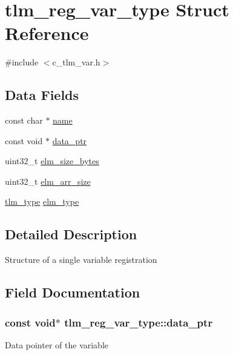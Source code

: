 \hypertarget{structtlm__reg__var__type}{}\section{tlm\+\_\+reg\+\_\+var\+\_\+type Struct Reference}
\label{structtlm__reg__var__type}


{\ttfamily \#include $<$c\+\_\+tlm\+\_\+var.\+h$>$}

\subsection*{Data Fields}
\begin{DoxyCompactItemize}
\item 
const char $\ast$ \hyperlink{structtlm__reg__var__type_a600d4d4c946ead86a0581cb71c676f4b}{name}
\item 
const void $\ast$ \hyperlink{structtlm__reg__var__type_a7c632c5c36956cb5eace919e07858feb}{data\+\_\+ptr}
\item 
uint32\+\_\+t \hyperlink{structtlm__reg__var__type_ac1af23a6695a1c110c6fc753e4101d96}{elm\+\_\+size\+\_\+bytes}
\item 
uint32\+\_\+t \hyperlink{structtlm__reg__var__type_ad348250db845ef8e6058282413fa3e81}{elm\+\_\+arr\+\_\+size}
\item 
\hyperlink{c__tlm__var_8h_a429969e0329f4a2abc124b7cef77fb29}{tlm\+\_\+type} \hyperlink{structtlm__reg__var__type_a5f5fc182b60c8600f5b6edaef48ac722}{elm\+\_\+type}
\end{DoxyCompactItemize}


\subsection{Detailed Description}
Structure of a single variable registration 

\subsection{Field Documentation}
\subsubsection[{\texorpdfstring{data\+\_\+ptr}{data_ptr}}]{\setlength{\rightskip}{0pt plus 5cm}const void$\ast$ tlm\+\_\+reg\+\_\+var\+\_\+type\+::data\+\_\+ptr}\hypertarget{structtlm__reg__var__type_a7c632c5c36956cb5eace919e07858feb}{}\label{structtlm__reg__var__type_a7c632c5c36956cb5eace919e07858feb}
Data pointer of the variable 
